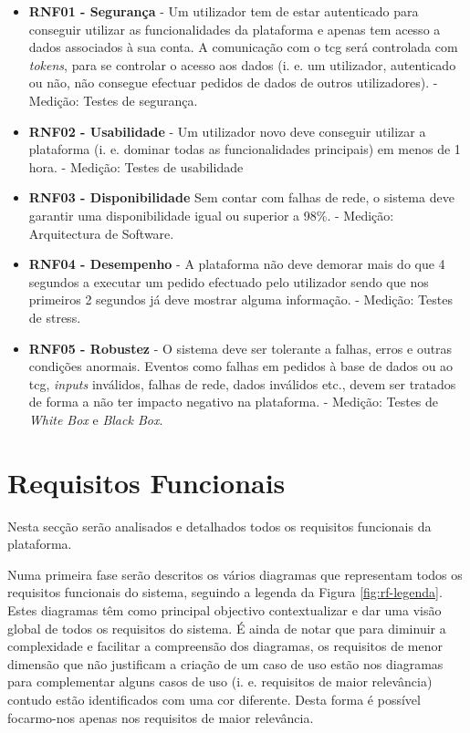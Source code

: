 \begin{itemize}
	\item \textbf{RNF01 - Segurança}
	\subitem - Um utilizador tem de estar autenticado para conseguir utilizar as funcionalidades da plataforma e apenas tem acesso a dados associados à sua conta. A comunicação com o \acrshort{tcg} será controlada com \textit{tokens}, para se controlar o acesso aos dados (i. e. um utilizador, autenticado ou não, não consegue efectuar pedidos de dados de outros utilizadores).
	\subitem - Medição: Testes de segurança.
	
	\item \textbf{RNF02 - Usabilidade} 
	\subitem - Um utilizador novo deve conseguir utilizar a plataforma (i. e. dominar todas as funcionalidades principais) em menos de 1 hora.
	\subitem - Medição: Testes de usabilidade
	
	\item \textbf{RNF03 - Disponibilidade}
	\subitem Sem contar com falhas de rede, o sistema deve garantir uma disponibilidade  igual ou superior a 98\%.
	\subitem - Medição: Arquitectura de Software.
	
	\item \textbf{RNF04 - Desempenho}
	\subitem - A plataforma não deve demorar mais do que 4 segundos a executar um pedido efectuado pelo utilizador sendo que nos primeiros 2 segundos já deve mostrar alguma informação.
	\subitem - Medição: Testes de stress.
	
	\item \textbf{RNF05 - Robustez}
	\subitem - O sistema deve ser tolerante a falhas, erros e outras condições anormais. Eventos como falhas em pedidos à base de dados ou ao \acrshort{tcg}, \textit{inputs} inválidos, falhas de rede, dados inválidos etc., devem ser tratados de forma a não ter impacto negativo na plataforma.
	\subitem - Medição: Testes de \textit{White Box} e \textit{Black Box}.
\end{itemize}


\section{Requisitos Funcionais}
\label{rf}

Nesta secção serão analisados e detalhados todos os requisitos funcionais da plataforma.

Numa primeira fase serão descritos os vários diagramas que representam todos os requisitos funcionais do sistema, seguindo a legenda da Figura \ref{fig:rf-legenda}. Estes diagramas têm como principal objectivo contextualizar e dar uma visão global de todos os requisitos do sistema. É ainda de notar que para diminuir a complexidade e facilitar a compreensão dos diagramas, os requisitos de menor dimensão que não justificam a criação de um caso de uso estão nos diagramas para complementar alguns casos de uso (i. e. requisitos de maior relevância) contudo estão identificados com uma cor diferente. Desta forma é possível focarmo-nos apenas nos requisitos de maior relevância.

